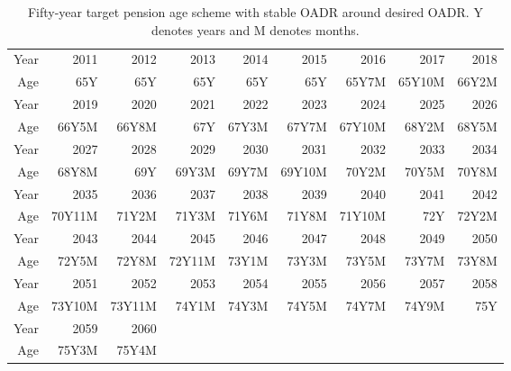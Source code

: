 \documentclass[11pt,a4paper,]{article}
\begin{document}
\begin{table}
\centering
\begin{tabular}{rrrrrrrrr}
\hline
Year & 2011   & 2012     & 2013   & 2014  & 2015   & 2016   & 2017   & 2018  \\
Age  & 65Y    & 65Y      & 65Y    & 65Y   & 65Y    & 65Y7M  & 65Y10M & 66Y2M \\
\hline
Year & 2019   & 2020     & 2021   & 2022  & 2023   & 2024   & 2025   & 2026  \\
Age  & 66Y5M  & 66Y8M    & 67Y    & 67Y3M & 67Y7M  & 67Y10M & 68Y2M  & 68Y5M \\
\hline
Year & 2027   & 2028     & 2029   & 2030  & 2031   & 2032   & 2033   & 2034  \\
Age  & 68Y8M  & 69Y      & 69Y3M  & 69Y7M & 69Y10M & 70Y2M  & 70Y5M  & 70Y8M \\
\hline
Year & 2035   & 2036     & 2037   & 2038  & 2039   & 2040   & 2041   & 2042  \\
Age  & 70Y11M & 71Y2M    & 71Y3M  & 71Y6M & 71Y8M  & 71Y10M & 72Y    & 72Y2M \\
\hline
Year & 2043   & 2044     & 2045   & 2046  & 2047   & 2048   & 2049   & 2050  \\
Age  & 72Y5M  & 72Y8M    & 72Y11M & 73Y1M & 73Y3M  & 73Y5M  & 73Y7M  & 73Y8M \\
\hline
Year & 2051   & 2052     & 2053   & 2054  & 2055   & 2056   & 2057   & 2058  \\
Age  & 73Y10M & 73Y11M   & 74Y1M  & 74Y3M & 74Y5M  & 74Y7M  & 74Y9M  & 75Y   \\
\hline
Year & 2059   & 2060  \\
Age  & 75Y3M  & 75Y4M \\
\hline
\end{tabular}

\caption{Fifty-year target pension age scheme with stable OADR around desired OADR. Y denotes years and M denotes months.}

\vspace{0.6cm}


\end{table}
\end{document}
